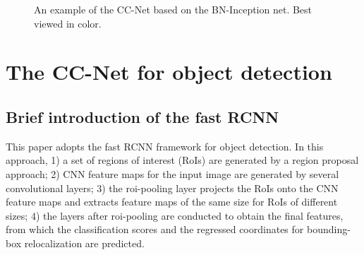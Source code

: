\documentclass[10pt,twocolumn,letterpaper]{article}
\begin{document}
\begin{figure*}
\begin{center}
\centerline{}
\end{center}
\vspace{-10pt}
   \caption{An example of the CC-Net based on the BN-Inception net.  Best viewed in color.}
\label{fig:SC_example}
\end{figure*}

\section{The CC-Net for object detection}

\subsection{Brief introduction of the fast RCNN}
This paper adopts the fast RCNN framework for object detection. In this approach, 1) a set of regions of interest (RoIs) are generated by a region proposal approach; 2)  CNN feature maps for the input image are generated by several convolutional layers;  3) the roi-pooling layer projects the RoIs onto the CNN feature maps and extracts feature maps of the same size for RoIs of different sizes; 4) the layers after roi-pooling are conducted to obtain the final features, from which the classification scores and the regressed coordinates for bounding-box relocalization are predicted. 
\end{document}
